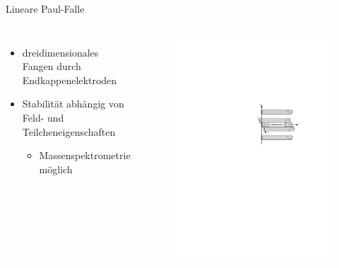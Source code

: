 \documentclass[12pt,xcolor=dvipsnames]{beamer}
\begin{document}
\begin{frame}{Lineare Paul-Falle}
	\begin{columns}[t]
		\begin{itemize}
				\item dreidimensionales Fangen durch Endkappenelektroden
				
				\item Stabilität abhängig von Feld- und Teilcheneigenschaften
				\begin{itemize}
					\item Massenspektrometrie möglich
				\end{itemize}
		\end{itemize}
		
			\vspace{-0.4cm}
			\begin{figure}[h]
				\centering
				\includegraphics[width=1\textwidth]{./figures/lineare_paulfalle.pdf}
			\end{figure}
	\end{columns}
	

\end{frame}
\end{document}

